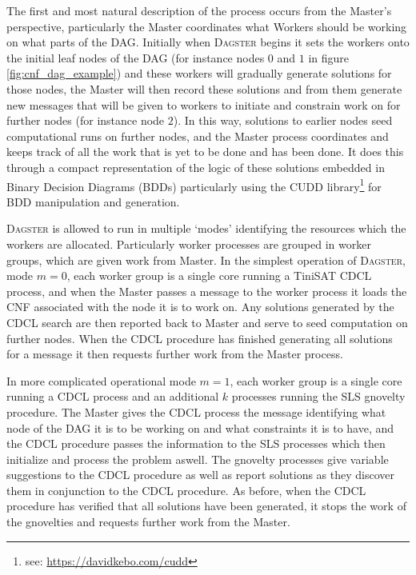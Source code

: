 \documentclass[
10pt, %
a4paper, %
oneside, %
headinclude,footinclude, %
BCOR5mm, %
]{scrartcl}
\begin{document}
The first and most natural description of the process occurs from the Master's perspective, particularly the Master coordinates what Workers should be working on what parts of the DAG.
Initially when \textsc{Dagster} begins it sets the workers onto the initial leaf nodes of the DAG (for instance nodes $0$ and $1$ in figure \ref{fig:cnf_dag_example})
and these workers will gradually generate solutions for those nodes, the Master will then record these solutions and from them generate new messages that will be given to workers to
initiate and constrain work on for further nodes (for instance node $2$).
In this way, solutions to earlier nodes seed computational runs on further nodes, and the Master process coordinates and keeps track of all the work that is yet to be done and has been done.
It does this through a compact representation of the logic of these solutions embedded in Binary Decision Diagrams (BDDs)
particularly using the CUDD library\footnote{see: \url{https://davidkebo.com/cudd}} for BDD manipulation and generation.

\textsc{Dagster} is allowed to run in multiple `modes' identifying the resources which the workers are allocated.
Particularly worker processes are grouped in worker groups, which are given work from Master.
In the simplest operation of \textsc{Dagster}, mode $m=0$, each worker group is a single core running a TiniSAT CDCL process, and when the Master passes a message to the worker process it loads the 
CNF associated with the node it is to work on.
Any solutions generated by the CDCL search are then reported back to Master and serve to seed computation on further nodes.
When the CDCL procedure has finished generating all solutions for a message it then requests further work from the Master process.

In more complicated operational mode $m=1$, each worker group is a single core running a CDCL process and an additional $k$ processes running the SLS gnovelty procedure.
The Master gives the CDCL process the message identifying what node of the DAG it is to be working on and what constraints it is to have, and the CDCL procedure passes the information
to the SLS processes which then initialize and process the problem aswell.
The gnovelty processes give variable suggestions to the CDCL procedure as well as report solutions as they discover them in conjunction to the CDCL procedure.
As before, when the CDCL procedure has verified that all solutions have been generated, it stops the work of the gnovelties and requests further work from the Master.
\end{document}
